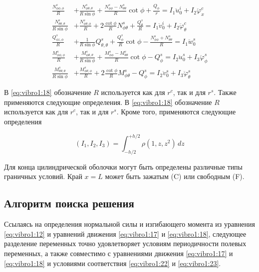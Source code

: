 \begin{equation}
	\label{eq:vibro1:18}
	\begin{split}
		\frac{N_{\phi \phi, \phi}^s}{R} &+ \frac{N_{\phi \theta,\theta}^s}{R\sin{\phi}} + \frac{N_{\phi \phi}^s - N_{\theta \theta}^s}{R} \cot{\phi} + \frac{Q_{\phi}}{r}= I_1 \ddot{u}_0^i+I_2 \ddot{\varphi}_x^c
		\\
		\frac{N_{\theta \theta, \theta}^s}{R \sin{\phi}} &+ \frac{N_{\phi \theta,\phi}^s}{R} + 2\frac{\cot{\phi}}{R} N_{\phi \theta}^s + \frac{Q_{\theta}^s}{R}= I_1 \ddot{v}_0^i+I_2 \ddot{\varphi}_{\theta}^c
		\\
		\frac{Q_{\phi z, \phi}^s}{R} &+ \frac{1}{R \sin{\phi}} Q_{\theta, \theta}^s + \frac{Q_{\phi}^s}{R}\cot{\phi}  - \frac{N_{\phi \phi}^s + N_{\theta \theta}^s}{R} = I_1 \ddot{w}_0^s
		\\
		\frac{M_{\phi \phi, \phi}^s}{R}&+\frac{M_{\phi \theta, \theta}^s}{R \sin{\phi}}+\frac{M_{\phi \phi}^s - M_{\theta \theta}^s}{R} \cot{\phi} - Q_{\phi}^s =I_2 \ddot{u}_0^s + I_3 \ddot{\varphi}_{\phi}^s
		\\
		\frac{M_{\theta \theta, \theta}^s}{R \sin{\phi}}&+\frac{M_{\phi \theta, \phi}^s}{R }+2\frac{\cot{\phi}}{R} M_{\phi \theta}^s - Q_{\phi}^s =I_2 \ddot{v}_0^s + I_3 \ddot{\varphi}_{\theta}^s
	\end{split}
\end{equation} 

В \cref{eq:vibro1:18} обозначение \(R\) используется как для \(r^c\), так и для \(r^s\). Также применяются следующие определения. В \cref{eq:vibro1:18} обозначение \(R\) используется как для \(r^c\), так и для \(r^s\). Кроме того, применяются следующие определения

\begin{equation}
	\label{eq:vibro1:19}
	\left ( I_1, I_2, I_3 \right ) = \int_{-h/2}^{+h/2} \rho (1, z, z^2)\, dz
\end{equation}

Для конца цилиндрической оболочки могут быть определены различные типы граничных условий. Край \(x = L\) может быть зажатым (C) или свободным (F). 


\subsection{Алгоритм поиска решения}\label{ch:ch3/sec2/sub4}

Ссылаясь на определения нормальной силы и изгибающего момента из уравнения \cref{eq:vibro1:12} и уравнений движения \cref{eq:vibro1:17} и \cref{eq:vibro1:18}, следующее разделение переменных точно удовлетворяет условиям периодичности полевых переменных, а также совместимо с уравнениями движения \cref{eq:vibro1:17} и \cref{eq:vibro1:18} и условиями соответствия \cref{eq:vibro1:22} и \cref{eq:vibro1:23}.

